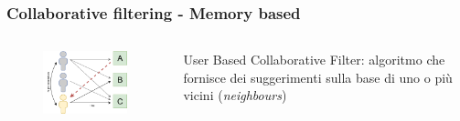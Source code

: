 \begin{frame}
    \frametitle{Collaborative filtering - Memory based}
    \begin{columns}
        \begin{column}{0.5\textwidth}
            \begin{figure}
                \centering
                \includegraphics[scale=0.5]{images/UB_CF_ex}
            \end{figure}
        \end{column}
        \begin{column}{0.5\textwidth}
            \alert{User Based Collaborative Filter}: algoritmo che fornisce dei suggerimenti sulla base di uno o più vicini (\textit{neighbours})
        \end{column}
    \end{columns}
\end{frame}

